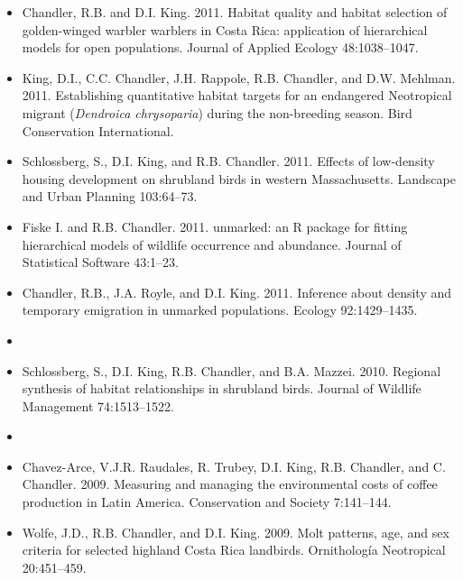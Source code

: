 \documentclass[12pt]{article}
\begin{document}
\begin{itemize}
\item Chandler, R.B. and D.I. King. 2011. Habitat quality and
  habitat selection of golden-winged warbler warblers in Costa Rica:
  application of hierarchical models for open populations. Journal of
  Applied Ecology 48:1038--1047.

\item King, D.I., C.C. Chandler, J.H. Rappole, R.B. Chandler, and
  D.W. Mehlman. 2011. Establishing quantitative habitat targets
  for an endangered Neotropical migrant ({\it Dendroica chrysoparia})
  during the non-breeding season. Bird Conservation
  International. %

\item Schlossberg, S., D.I. King, and R.B. Chandler. 2011. Effects
  of low-density housing development on shrubland birds
  in western Massachusetts. Landscape and Urban Planning 103:64--73.

\item Fiske I. and R.B. Chandler. 2011. unmarked: an R package
  for fitting hierarchical models of wildlife occurrence and
  abundance. Journal of Statistical Software 43:1--23.

\item Chandler, R.B., J.A. Royle, and D.I. King. 2011. Inference
  about density and temporary emigration in unmarked
  populations. Ecology 92:1429--1435.


\item[] { \\}

\item Schlossberg, S., D.I. King, R.B. Chandler, and
  B.A. Mazzei. 2010. Regional synthesis of habitat relationships in
  shrubland birds. Journal of Wildlife Management 74:1513--1522.

\item[] { \\}

\item Chavez-Arce, V.J.R. Raudales, R. Trubey, D.I. King,
  R.B. Chandler, and C. Chandler. 2009. Measuring and managing the
  environmental costs of coffee production in Latin
  America. Conservation and Society 7:141--144.

\item Wolfe, J.D., R.B. Chandler, and D.I. King. 2009. Molt
  patterns, age, and sex criteria for selected highland Costa Rica
  landbirds. Ornitholog\'{i}a Neotropical 20:451--459.


\end{itemize}
\end{document}
